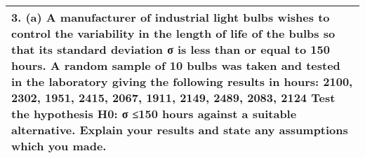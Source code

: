 \documentclass[a4paper,12pt]{article}
\begin{document}
\begin{table}[ht!]
 
\centering
 
\begin{tabular}{|p{15cm}|}
 
\hline  

3. (a) A manufacturer of industrial light bulbs wishes to control the variability in the length of life of the bulbs so that its standard deviation σ is less than or equal to 150 hours.  A random sample of 10 bulbs was taken and tested in the laboratory giving the following results in hours:
2100,  2302,  1951,  2415,  2067,  1911,  2149,  2489,  2083,  2124
Test the hypothesis H0: σ ≤150 hours against a suitable alternative.  Explain your results and state any assumptions which you made.

\\ \hline
  
\end{tabular}

\end{table}
\end{document}

